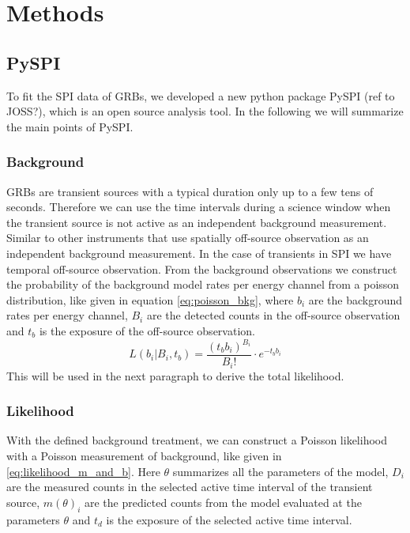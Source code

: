 \documentclass[modern]{aastex631}
\begin{document}
\section{Methods}
\subsection{PySPI}
\label{pyspi}
To fit the SPI data of GRBs, we developed a new python package PySPI (ref to JOSS?), which is an open source analysis tool. In the following we will summarize the main points of PySPI.

\subsubsection*{Background}

GRBs are transient sources with a typical duration only up to a few tens of seconds.
Therefore we can use the time intervals during a science window when the transient source is not active as an independent background measurement. Similar to other instruments that use spatially off-source observation as an independent background measurement. In the case of transients in SPI we have temporal off-source observation. From the background observations we construct the probability of the background model rates per energy channel from a poisson distribution, like given in equation \ref{eq:poisson_bkg}, where $b_{i}$ are the background rates per energy channel, $B_{i}$ are the detected counts in the off-source observation and $t_{b}$ is the exposure of the off-source observation.
\begin{equation}
	L(b_{i}|B_{i}, t_{b})=\frac{(t_{b} b_{i})^{B_{i}}}{B_{i}!}\cdot e^{-t_{b} b_{i}}
  \label{eq:poisson_bkg}
\end{equation}
This will be used in the next paragraph to derive the total likelihood.

\subsubsection*{Likelihood}

With the defined background treatment, we can construct a Poisson likelihood with a Poisson measurement of background, like given in \ref{eq:likelihood_m_and_b}. Here $\theta$ summarizes all the parameters of the model, $D_{i}$ are the measured counts in the selected active time interval of the transient source, $m(\theta)_{i}$ are the predicted counts from the model evaluated at the parameters $\theta$ and $t_{d}$ is the exposure of the selected active time interval.
\end{document}
